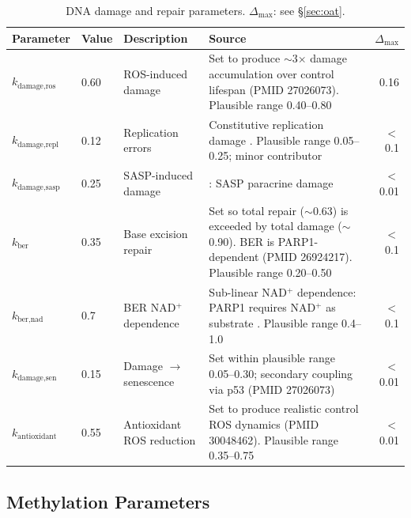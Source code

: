 \documentclass[11pt]{article}
\begin{document}
\begin{table}[H]
\centering
\caption{DNA damage and repair parameters. $\Delta_{\max}$: see \S\ref{sec:oat}.}
\begin{tabular}{|ll|p{3cm}|p{6cm}|r|}
\hline
Parameter & Value & Description & Source & $\Delta_{\max}$ \\
\hline
$k_{\text{damage,ros}}$ & 0.60 & ROS-induced damage & Set to produce $\sim$3$\times$ damage accumulation over control lifespan (PMID 27026073). Plausible range 0.40--0.80 & 0.16 \\
\hline
$k_{\text{damage,repl}}$ & 0.12 & Replication errors & Constitutive replication damage \citep{Lindahl1993}. Plausible range 0.05--0.25; minor contributor & $<$0.1 \\
\hline
$k_{\text{damage,sasp}}$ & 0.25 & SASP-induced damage & \citet{Coppe2008}: SASP paracrine damage & $<$0.01 \\
\hline
$k_{\text{ber}}$ & 0.35 & Base excision repair & Set so total repair ($\sim$0.63) is exceeded by total damage ($\sim$0.90). BER is PARP1-dependent (PMID 26924217). Plausible range 0.20--0.50 & $<$0.1 \\
\hline
$k_{\text{ber,nad}}$ & 0.7 & BER NAD$^+$ dependence & Sub-linear NAD$^+$ dependence: PARP1 requires NAD$^+$ as substrate \citep{Bai2011}. Plausible range 0.4--1.0 & $<$0.1 \\
\hline
$k_{\text{damage,sen}}$ & 0.15 & Damage $\to$ senescence & Set within plausible range 0.05--0.30; secondary coupling via p53 (PMID 27026073) & $<$0.01 \\
\hline
$k_{\text{antioxidant}}$ & 0.55 & Antioxidant ROS reduction & Set to produce realistic control ROS dynamics (PMID 30048462). Plausible range 0.35--0.75 & $<$0.01 \\
\hline
\end{tabular}
\end{table}

\subsection{Methylation Parameters}
\end{document}
